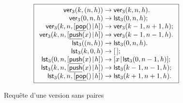 \begin{figure}
\begin{equation*}
\boxed{%
\begin{array}{r@{\;}l@{\;}l}
\fun{ver}_3(k,\pair{n}{h}) & \rightarrow & \fun{ver}_3(k,n,h).\\
\fun{ver}_3(0,n,h) & \rightarrow & \fun{lst}_3(0,n,h);\\
\fun{ver}_3(k,n,\cons{\ufun{pop}()}{h})
                      & \rightarrow & \fun{ver}_3(k-1,n+1,h);\\
\fun{ver}_3(k,n,\cons{\ufun{push}(x)}{h})
                      & \rightarrow & \fun{ver}_3(k-1,n-1,h).\\
\fun{lst}_3(\pair{n}{h}) & \rightarrow & \fun{lst}_3(0,n,h).\\
\fun{lst}_3(k,0,h) & \rightarrow & \el;\\
\fun{lst}_3(0,n,\cons{\ufun{push}(x)}{h}) & \rightarrow
                      & \cons{x}{\fun{lst}_3(0,n-1,h)};\\
\fun{lst}_3(k,n,\cons{\ufun{push}(x)}{h}) & \rightarrow
                      & \fun{lst}_3(k-1,n-1,h);\\
\fun{lst}_3(k,n,\cons{\ufun{pop}()}{h}) & \rightarrow
                      & \fun{lst}_3(k+1,n+1,h).
\end{array}}
\end{equation*}
\caption{Requête d'une version sans paires\label{fig_ver_no_pair}}
\end{figure}

